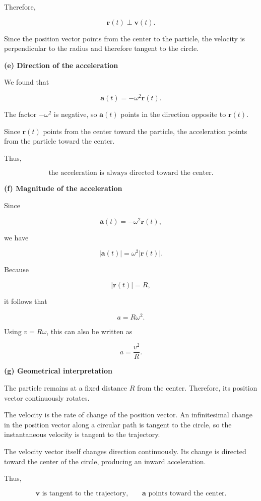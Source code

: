\documentclass[12pt]{article}
\theoremstyle{remark}
\begin{document}
Therefore,

\[
\boxed{
\mathbf{r}(t)\perp\mathbf{v}(t).
}
\]

Since the position vector points from the center to the particle, the velocity is perpendicular to the radius and therefore tangent to the circle.

\textbf{(e) Direction of the acceleration}

We found that

\[
\mathbf{a}(t)=-\omega^2\mathbf{r}(t).
\]

The factor \(-\omega^2\) is negative, so \(\mathbf{a}(t)\) points in the direction opposite to \(\mathbf{r}(t)\).

Since \(\mathbf{r}(t)\) points from the center toward the particle, the acceleration points from the particle toward the center.

Thus,

\[
\boxed{
\text{the acceleration is always directed toward the center.}
}
\]

\textbf{(f) Magnitude of the acceleration}

Since

\[
\mathbf{a}(t)=-\omega^2\mathbf{r}(t),
\]

we have

\[
|\mathbf{a}(t)|
=
\omega^2|\mathbf{r}(t)|.
\]

Because

\[
|\mathbf{r}(t)|=R,
\]

it follows that

\[
\boxed{
a=R\omega^2.
}
\]

Using \(v=R\omega\), this can also be written as

\[
\boxed{
a=\frac{v^2}{R}.
}
\]

\textbf{(g) Geometrical interpretation}

The particle remains at a fixed distance \(R\) from the center. Therefore, its position vector continuously rotates.

The velocity is the rate of change of the position vector. An infinitesimal change in the position vector along a circular path is tangent to the circle, so the instantaneous velocity is tangent to the trajectory.

The velocity vector itself changes direction continuously. Its change is directed toward the center of the circle, producing an inward acceleration.

Thus,

\[
\boxed{
\mathbf{v}\text{ is tangent to the trajectory,}
\qquad
\mathbf{a}\text{ points toward the center.}
}
\]
\end{document}
